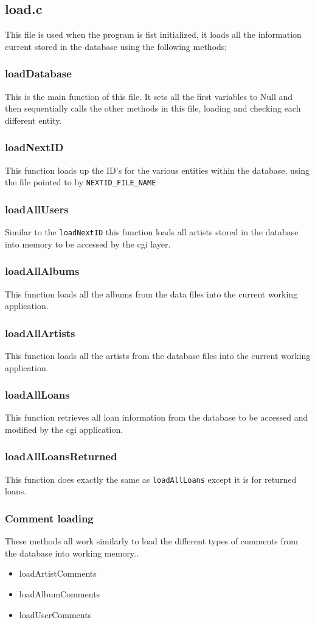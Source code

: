 \documentclass{article}
\begin{document}
\subsection{load.c}
This file is used when the program is fist initialized, it loads all the information current stored in the database using the following methods;
\subsubsection*{loadDatabase}
This is the main function of this file. It sets all the first variables to Null
and then sequentially calls the other methods in this file, loading and checking each different entity.
\subsubsection*{loadNextID}
This function loads up the ID's for the various entities within the database, using the file pointed to by \verb|NEXTID_FILE_NAME|
\subsubsection*{loadAllUsers}
Similar to the \verb|loadNextID| this function loads all artists stored in the database into memory to be accessed by the cgi layer.
\subsubsection*{loadAllAlbums}
This function loads all the albums from the data files into the current working application.
\subsubsection*{loadAllArtists}
This function loads all the artists from the database files into the current working application.
\subsubsection*{loadAllLoans}
\label{loan}
This function retrieves all loan information from the database to be accessed and modified by the cgi application.
\subsubsection*{loadAllLoansReturned}
This function does exactly the same as \verb|loadAllLoans| except it is for returned loans.
\subsubsection*{Comment loading}
These methods all work similarly to load the different types of comments from the database into working memory..
\begin{itemize}
\item{loadArtistComments}
\item{loadAlbumComments}
\item{loadUserComments}
\end{itemize}
\end{document}
